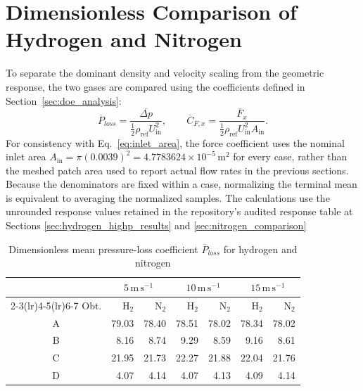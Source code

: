 \clearpage

\endgroup

\section{Dimensionless Comparison of Hydrogen and Nitrogen}
\label{sec:results_operating_states}
\label{sec:gas_coefficient_comparison}

To separate the dominant density and velocity scaling from the geometric response, the two gases are compared using the coefficients defined in Section~\ref{sec:doe_analysis}:
\begin{equation}
\overline{P}_{loss}=\frac{\overline{\Delta p}}{\tfrac12\rho_{\mathrm{ref}}U_{\mathrm{in}}^2},
\qquad
\overline{C}_{F,x}=\frac{\overline{F}_x}{\tfrac12\rho_{\mathrm{ref}}U_{\mathrm{in}}^2A_{\mathrm{in}}}.
\label{eq:mean_response_coefficients}
\end{equation}
For consistency with Eq.~\eqref{eq:inlet_area}, the force coefficient uses the nominal inlet area $A_{\mathrm{in}}=\pi(0.0039)^2=4.7783624\times10^{-5}\,\mathrm{m^2}$ for every case, rather than the meshed patch area used to report actual flow rates in the previous sections. Because the denominators are fixed within a case, normalizing the terminal mean is equivalent to averaging the normalized samples. The calculations use the unrounded response values retained in the repository's audited response table at Sections \ref{sec:hydrogen_highp_results} and \ref{sec:nitrogen_comparison}

\begin{table}[htbp]
\centering
\small
\begin{tabular}{@{}crrrrrr@{}}
\toprule
& \multicolumn{2}{c}{$5\,\mathrm{m\,s^{-1}}$} & \multicolumn{2}{c}{$10\,\mathrm{m\,s^{-1}}$} & \multicolumn{2}{c}{$15\,\mathrm{m\,s^{-1}}$}\\
\cmidrule(lr){2-3}\cmidrule(lr){4-5}\cmidrule(lr){6-7}
Obt. & $\mathrm{H}_2$ & $\mathrm{N}_2$ & $\mathrm{H}_2$ & $\mathrm{N}_2$ & $\mathrm{H}_2$ & $\mathrm{N}_2$\\
\midrule
A & 79.03 & 78.40 & 78.51 & 78.02 & 78.34 & 78.02\\
B & 8.16 & 8.74 & 9.29 & 8.59 & 9.16 & 8.61\\
C & 21.95 & 21.73 & 22.27 & 21.88 & 22.04 & 21.76\\
D & 4.07 & 4.14 & 4.07 & 4.13 & 4.09 & 4.14\\
\bottomrule
\end{tabular}
\caption{Dimensionless mean pressure-loss coefficient $\overline{P}_{loss}$ for hydrogen and nitrogen}
\label{tab:pressure_coefficients_gases}
\end{table}

